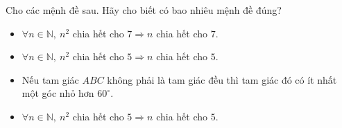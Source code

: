 \begin{ex}
Cho các mệnh đề sau. Hãy cho biết có bao nhiêu mệnh đề đúng?
\begin{itemize}
\item $\forall n\in\mathbb N,\ n^2$ chia hết cho $7\Rightarrow n$ chia hết cho $7$.
\item $\forall n\in\mathbb N,\ n^2$ chia hết cho $5\Rightarrow n$ chia hết cho $5$.
\item Nếu tam giác $ABC$ không phải là tam giác đều thì tam giác đó có ít nhất một góc nhỏ hơn $60^\circ$.
\item $\forall n\in\mathbb N,\ n^2$ chia hết cho $5\Rightarrow n$ chia hết cho $5$.
\end{itemize}
\end{ex}
